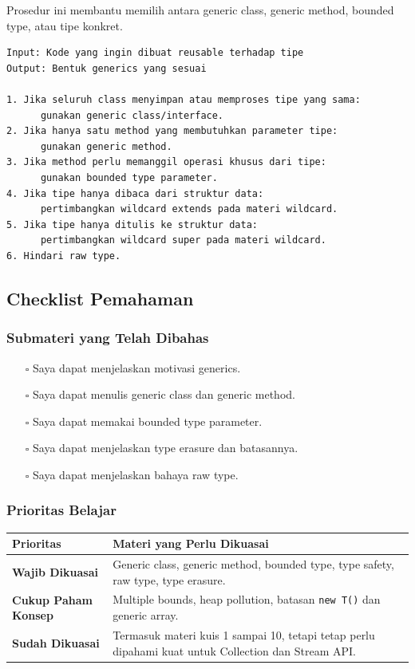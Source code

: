 \begin{jawab}
Prosedur ini membantu memilih antara generic class, generic method, bounded type, atau tipe konkret.
\end{jawab}

\begin{lstlisting}[caption={Pseudocode pemilihan generics}, label={lst:generics-decision}]
Input: Kode yang ingin dibuat reusable terhadap tipe
Output: Bentuk generics yang sesuai

1. Jika seluruh class menyimpan atau memproses tipe yang sama:
      gunakan generic class/interface.
2. Jika hanya satu method yang membutuhkan parameter tipe:
      gunakan generic method.
3. Jika method perlu memanggil operasi khusus dari tipe:
      gunakan bounded type parameter.
4. Jika tipe hanya dibaca dari struktur data:
      pertimbangkan wildcard extends pada materi wildcard.
5. Jika tipe hanya ditulis ke struktur data:
      pertimbangkan wildcard super pada materi wildcard.
6. Hindari raw type.
\end{lstlisting}

\subsection{Checklist Pemahaman}

\subsubsection{Submateri yang Telah Dibahas}

\begin{itemize}
    \item[$\square$] Saya dapat menjelaskan motivasi generics.
    \item[$\square$] Saya dapat menulis generic class dan generic method.
    \item[$\square$] Saya dapat memakai bounded type parameter.
    \item[$\square$] Saya dapat menjelaskan type erasure dan batasannya.
    \item[$\square$] Saya dapat menjelaskan bahaya raw type.
\end{itemize}

\subsubsection{Prioritas Belajar}

\begin{tabularx}{\textwidth}{|L{0.22\textwidth}|X|}
\hline
\textbf{Prioritas} & \textbf{Materi yang Perlu Dikuasai} \\
\hline
\textbf{Wajib Dikuasai} & Generic class, generic method, bounded type, type safety, raw type, type erasure. \\
\hline
\textbf{Cukup Paham Konsep} & Multiple bounds, heap pollution, batasan \texttt{new T()} dan generic array. \\
\hline
\textbf{Sudah Dikuasai} & Termasuk materi kuis 1 sampai 10, tetapi tetap perlu dipahami kuat untuk Collection dan Stream API. \\
\hline
\end{tabularx}
